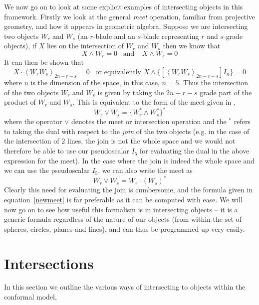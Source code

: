 We now go on to look at some explicit examples of
intersecting objects in this framework. Firstly we look
at the general \emph{meet} operation, familiar from
projective geometry, and how it appears in geometric
algebra. Suppose we are intersecting two objects $W_r$
and $W_s$ (an $r$-blade and an $s$-blade representing $r$
and $s$-grade objects), if $X$ lies on the intersection
of $W_r$ and $W_s$ then we know that
%
\[ X\wedge W_r = 0 \;\;\;\mbox{and}\;\;\;\; X\wedge W_s = 0
\]
%
It can then be shown that
%
\begin{equation}
X\cdot \left< W_r W_s \right>_{2n-r-s} = 0 \;\;\; \mbox{or equivalently }
X\wedge \{\left[\left< W_r W_s \right>_{2n-r-s}\right]I_n\} = 0
\label{newmeet}
\end{equation}
%
where $n$ is the dimension of the space, in this case, $n=5$. Thus
the intersection of the two objects $W_r$ and $W_s$ is given by
taking the $2n-r-s$ grade part of the product of $W_r$ and $W_s$.
This is equivalent to the form of the meet given in
\cite{HZ91,HS84},
%
\begin{equation}
W_r \vee W_s = \{ W_r^* \wedge W_s^*\}^*
\end{equation}
%
where the operator $\vee$ denotes the meet or
intersection operation and the $^*$ refers to taking the
dual with respect to the \emph{join} of the two objects
(e.g. in the case of the intersection of 2 lines, the
join is not the whole space and we would not therefore be
able to use our pseudoscalar $I_5$ for evaluating the
dual in the above expression for the meet). In the case
where the join is indeed the whole space and we can use
the pseudoscalar $I_5$, we can also write the meet as
%
\[W_r \vee W_s = W_r \cdot (W_s)^*  \]
%
Clearly this need for evaluating the join is cumbersome, and the
formula given in equation~\ref{newmeet} is far preferable as it
can be computed with ease. We will now go on to see how useful
this formalism is in intersecting objects -- it is a generic
formula regardless of the nature of our objects (from within the
set of spheres, circles, planes and lines), and can thus be
programmed up very easily.



\section{Intersections}

In this section we outline the various ways of intersecting to
objects within the conformal model,

